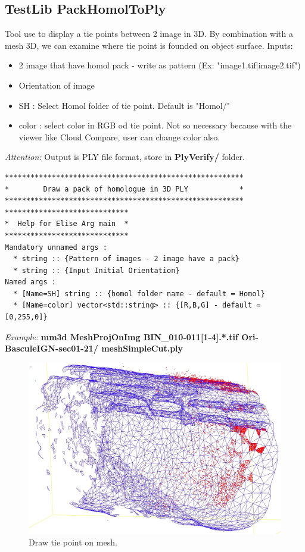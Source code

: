 \subsection{TestLib PackHomolToPly}
Tool use to display a tie points between 2 image in 3D. By combination with a mesh 3D, we can examine where tie point is founded on object surface.
Inputs:
\begin{itemize}
\item 2 image that have homol pack - write as pattern (Ex: "image1.tif|image2.tif")
\item Orientation of image
\item SH : Select Homol folder of tie point. Default is "Homol/"
\item color : select color in RGB od tie point. Not so necessary because with the viewer like Cloud Compare, user can change color also.
\end{itemize}
\textit{Attention:} Output is PLY file format, store in \textbf{PlyVerify/} folder.

\begin{verbatim}
********************************************************
*        Draw a pack of homologue in 3D PLY            *
********************************************************
*****************************
*  Help for Elise Arg main  *
*****************************
Mandatory unnamed args : 
  * string :: {Pattern of images - 2 image have a pack}
  * string :: {Input Initial Orientation}
Named args : 
  * [Name=SH] string :: {homol folder name - default = Homol}
  * [Name=color] vector<std::string> :: {[R,B,G] - default = [0,255,0]}

\end{verbatim}
\textit{Example:}
\textbf{mm3d MeshProjOnImg BIN\_010-011[1-4].*.tif Ori-BasculeIGN-sec01-21/ meshSimpleCut.ply}

\begin{figure}[H]
\centering
\includegraphics[width=15cm]{FIGS/MeshProjOnImg/TiePOnMesh.jpeg}
\caption{Draw tie point on mesh.}
\label{SurfCorr}
\end{figure}



